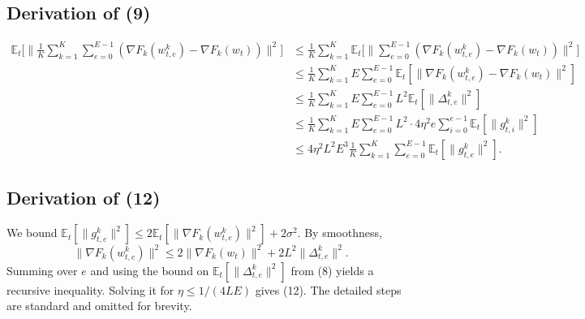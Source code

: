 \documentclass{article}
\begin{document}
\subsection*{Derivation of (9)}
\begin{align}
\mathbb{E}_t\Big[\Big\|\frac{1}{K}\sum_{k=1}^K \sum_{e=0}^{E-1} (\nabla F_k(w_{t,e}^k) - \nabla F_k(w_t))\Big\|^2\Big]
&\le \frac{1}{K}\sum_{k=1}^K \mathbb{E}_t\Big[\Big\|\sum_{e=0}^{E-1} (\nabla F_k(w_{t,e}^k) - \nabla F_k(w_t))\Big\|^2\Big] \\
&\le \frac{1}{K}\sum_{k=1}^K E \sum_{e=0}^{E-1} \mathbb{E}_t[\|\nabla F_k(w_{t,e}^k) - \nabla F_k(w_t)\|^2] \\
&\le \frac{1}{K}\sum_{k=1}^K E \sum_{e=0}^{E-1} L^2 \mathbb{E}_t[\|\Delta_{t,e}^k\|^2] \\
&\le \frac{1}{K}\sum_{k=1}^K E \sum_{e=0}^{E-1} L^2 \cdot 4\eta^2 e \sum_{i=0}^{e-1} \mathbb{E}_t[\|g_{t,i}^k\|^2] \\
&\le 4\eta^2 L^2 E^3 \frac{1}{K}\sum_{k=1}^K \sum_{e=0}^{E-1} \mathbb{E}_t[\|g_{t,e}^k\|^2].
\end{align}

\subsection*{Derivation of (12)}
We bound $\mathbb{E}_t[\|g_{t,e}^k\|^2] \le 2\mathbb{E}_t[\|\nabla F_k(w_{t,e}^k)\|^2] + 2\sigma^2$. By smoothness,
\begin{equation}
\|\nabla F_k(w_{t,e}^k)\|^2 \le 2\|\nabla F_k(w_t)\|^2 + 2L^2 \|\Delta_{t,e}^k\|^2.
\end{equation}
Summing over $e$ and using the bound on $\mathbb{E}_t[\|\Delta_{t,e}^k\|^2]$ from (8) yields a recursive inequality. Solving it for $\eta \le 1/(4LE)$ gives (12). The detailed steps are standard and omitted for brevity.
\end{document}
